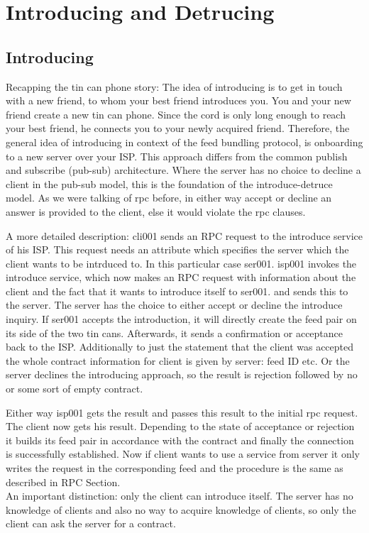 \section{Introducing and Detrucing}
\subsection{Introducing}
Recapping the tin can phone story: The idea of introducing is to get in touch with a new friend, to whom your best friend introduces you. You and your new friend create a new tin can phone. Since the cord is only long enough to reach your best friend, he connects you to your newly acquired friend. Therefore, the general idea of introducing in context of the feed bundling protocol, is onboarding to a new server over your ISP. This approach differs from the common publish and subscribe (pub-sub) architecture. Where the server has no choice to decline a client in the pub-sub model, this is the foundation of the introduce-detruce model. As we were talking of rpc before, in either way accept or decline an answer is provided to the client, else it would violate the rpc clauses.

A more detailed description: cli001 sends an RPC request to the introduce service of his ISP. This request needs an attribute which specifies the server which the client wants to be intrduced to. In this particular case ser001. isp001 invokes the introduce service, which now makes an RPC request with information about the client and the fact that it wants to introduce itself to ser001. and sends this to the server. The server has the choice to either accept or decline the introduce inquiry. If ser001 accepts the introduction, it will directly create the feed pair on its side of the two tin cans. Afterwards, it sends a confirmation or acceptance back to the ISP. Additionally to just the statement that the client was accepted the whole contract information for client is given by server: feed ID etc. 
Or the server declines the introducing approach, so the result is rejection followed by no or some sort of empty contract.

Either way isp001 gets the result and passes this result to the initial rpc request. The client now gets his result. Depending to the state of acceptance or rejection it builds its feed pair in accordance with the contract and finally the connection is successfully established. Now if client wants to use a service from server it only writes the request in the corresponding feed and the procedure is the same as described in RPC Section.
\\
An important distinction: only the client can introduce itself. The server has no knowledge of clients and also no way to acquire knowledge of clients, so only the client can ask the server for a contract. 

